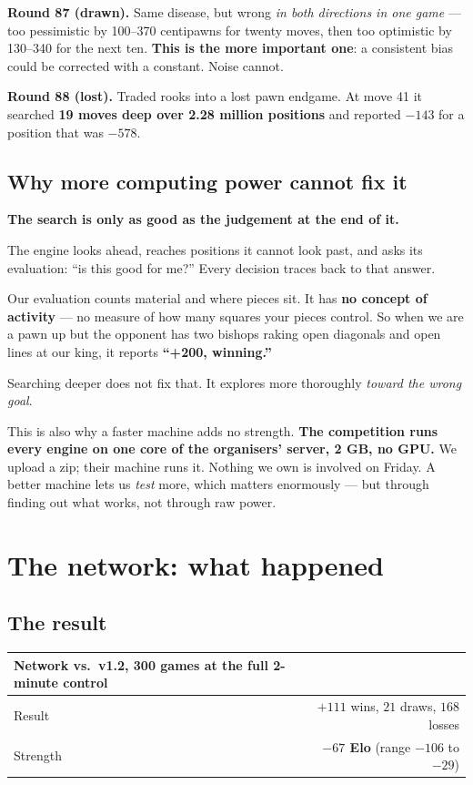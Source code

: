 \documentclass[11pt,a4paper]{article}
\newcommand{\bad}[1]{\textcolor{red!65!black}{\textbf{#1}}}
\begin{document}
\textbf{Round 87 (drawn).} Same disease, but wrong \emph{in both directions in one game} ---
too pessimistic by 100--370 centipawns for twenty moves, then too optimistic by 130--340 for the
next ten. \textbf{This is the more important one}: a consistent bias could be corrected with a
constant. Noise cannot.

\textbf{Round 88 (lost).} Traded rooks into a lost pawn endgame. At move 41 it searched
\textbf{19 moves deep over 2.28 million positions} and reported $-143$ for a position that was
$-578$.

\subsection{Why more computing power cannot fix it}

\begin{keybox}
\textbf{The search is only as good as the judgement at the end of it.}

The engine looks ahead, reaches positions it cannot look past, and asks its evaluation: ``is this
good for me?'' Every decision traces back to that answer.

Our evaluation counts material and where pieces sit. It has \textbf{no concept of activity} ---
no measure of how many squares your pieces control. So when we are a pawn up but the opponent has
two bishops raking open diagonals and open lines at our king, it reports \textbf{``+200,
winning.''}

Searching deeper does not fix that. It explores more thoroughly \emph{toward the wrong goal}.
\end{keybox}

This is also why a faster machine adds no strength. \textbf{The competition runs every engine on
one core of the organisers' server, 2 GB, no GPU.} We upload a zip; their machine runs it. Nothing
we own is involved on Friday. A better machine lets us \emph{test} more, which matters enormously
--- but through finding out what works, not through raw power.

\section{The network: what happened}

\subsection{The result}

\begin{center}
\begin{tabular}{lr}
\toprule
Network vs.\ v1.2, 300 games at the full 2-minute control & \\
\midrule
Result & $+111$ wins, $21$ draws, $168$ losses \\
Strength & \bad{$-67$ Elo} (range $-106$ to $-29$) \\
\bottomrule
\end{tabular}
\end{center}
\end{document}
